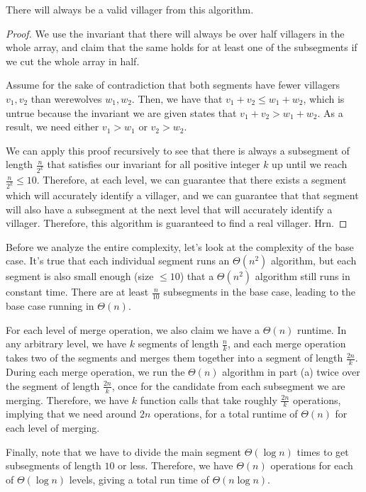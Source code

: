 \documentclass{article}
\begin{document}
\begin{enumerate}[label=\alph*)]
	\begin{lemma*}
		There will always be a valid villager from this algorithm.
	\end{lemma*}

	\begin{proof}
		We use the invariant that there will always be over half villagers in the whole array, and claim that the same holds for at least one of the subsegments if we cut the whole array in half. 

		Assume for the sake of contradiction that both segments have fewer villagers $v_1, v_2$ than werewolves $w_1, w_2$. Then, we have that $v_1 + v_2 \leq w_1 + w_2$, which is untrue because the invariant we are given states that $v_1 + v_2 > w_1 + w_2$. As a result, we need either $v_1 > w_1$ or $v_2 > w_2$. 

		We can apply this proof recursively to see that there is always a subsegment of length $\frac{n}{2^k}$ that satisfies our invariant for all positive integer $k$ up until we reach $\frac{n}{2^k} \leq 10$. Therefore, at each level, we can guarantee that there exists a segment which will accurately identify a villager, and we can guarantee that that segment will also have a subsegment at the next level that will accurately identify a villager. Therefore, this algorithm is guaranteed to find a real villager. Hrn. 
	\end{proof}

	Before we analyze the entire complexity, let's look at the complexity of the base case. It's true that each individual segment runs an $\Theta(n^2)$ algorithm, but each segment is also small enough (size $\leq 10$) that a $\Theta(n^2)$ algorithm still runs in constant time. There are at least $\frac{n}{10}$ subsegments in the base case, leading to the base case running in $\Theta(n)$.

	For each level of merge operation, we also claim we have a $\Theta(n)$ runtime. In any arbitrary level, we have $k$ segments of length $\frac{n}{k}$, and each merge operation takes two of the segments and merges them together into a segment of length $\frac{2n}{k}$. During each merge operation, we run the $\Theta(n)$ algorithm in part (a) twice over the segment of length $\frac{2n}{k}$, once for the candidate from each subsegment we are merging. Therefore, we have $k$ function calls that take roughly $\frac{2n}{k}$ operations, implying that we need around $2n$ operations, for a total runtime of $\Theta(n)$ for each level of merging. 

	Finally, note that we have to divide the main segment $\Theta(\log n)$ times to get subsegments of length $10$ or less. Therefore, we have $\Theta(n)$ operations for each of $\Theta(\log n)$ levels, giving a total run time of $\Theta(n \log n)$.
\end{enumerate}
\end{document}
